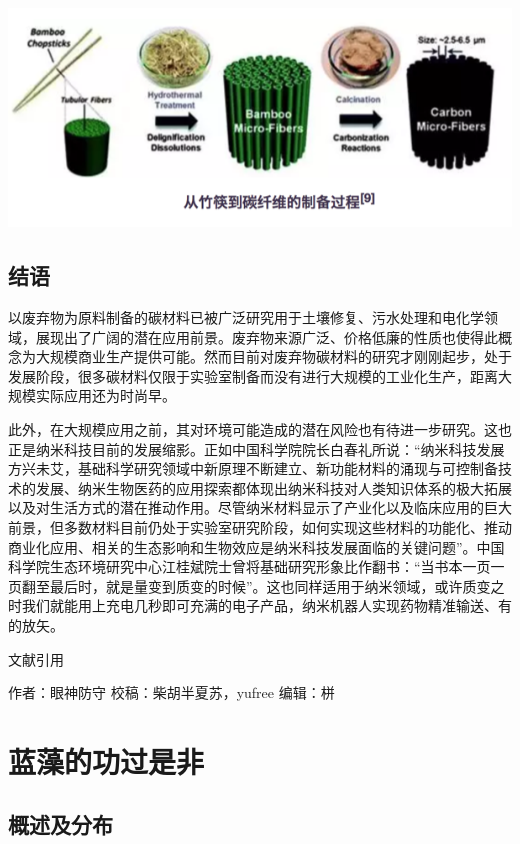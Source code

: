 \documentclass[]{book}
\begin{document}
\includegraphics[width=8.33in]{images/nano3}

\subsection{结语}\label{-4}

以废弃物为原料制备的碳材料已被广泛研究用于土壤修复、污水处理和电化学领域，展现出了广阔的潜在应用前景。废弃物来源广泛、价格低廉的性质也使得此概念为大规模商业生产提供可能。然而目前对废弃物碳材料的研究才刚刚起步，处于发展阶段，很多碳材料仅限于实验室制备而没有进行大规模的工业化生产，距离大规模实际应用还为时尚早。

此外，在大规模应用之前，其对环境可能造成的潜在风险也有待进一步研究。这也正是纳米科技目前的发展缩影。正如中国科学院院长白春礼所说：``纳米科技发展方兴未艾，基础科学研究领域中新原理不断建立、新功能材料的涌现与可控制备技术的发展、纳米生物医药的应用探索都体现出纳米科技对人类知识体系的极大拓展以及对生活方式的潜在推动作用。尽管纳米材料显示了产业化以及临床应用的巨大前景，但多数材料目前仍处于实验室研究阶段，如何实现这些材料的功能化、推动商业化应用、相关的生态影响和生物效应是纳米科技发展面临的关键问题''。中国科学院生态环境研究中心江桂斌院士曾将基础研究形象比作翻书：``当书本一页一页翻至最后时，就是量变到质变的时候''。这也同样适用于纳米领域，或许质变之时我们就能用上充电几秒即可充满的电子产品，纳米机器人实现药物精准输送、有的放矢。

文献引用

作者：眼神防守 校稿：柴胡半夏苏，yufree 编辑：栟

\section{蓝藻的功过是非}

\subsection{概述及分布}
\end{document}
